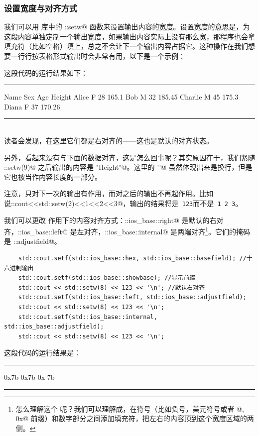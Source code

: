 \subsubsection*{设置宽度与对齐方式}
我们可以用 \lstinline@iomanip@ 库中的 \lstinline@std::setw@ 函数来设置输出内容的宽度。设置宽度的意思是，为这段内容单独定制一个输出宽度，如果输出内容实际上没有那么宽，那程序也会拿填充符（比如空格）填上，总之不会让下一个输出内容占据它。这种操作在我们想要一行行按表格形式输出时会非常有用，以下是一个示例：

这段代码的运行结果如下：\\\noindent\rule{\linewidth}{.2pt}
\begin{verbatim*}
     Name  Sex  Age  Height
    Alice    F   28    165.1
      Bob    M   32   185.45
  Charlie    M   45    175.3
    Diana    F   37   170.26
\end{verbatim*}\noindent\rule{\linewidth}{.2pt}\\
读者会发现，在这里它们都是右对齐的——这也是默认的对齐状态。\par
另外，\lstinline@Height@ 看起来没有与下面的数据对齐，这是怎么回事呢？其实原因在于，我们紧随 \lstinline@std::setw(9)@ 之后输出的内容是 \lstinline@"Height\n"@。这里的 \lstinline@'\n'@ 虽然体现出来是换行，但是它也被当作内容长度的一部分。\par
注意，\lstinline@setw@ 只对下一次的输出有作用，而对之后的输出不再起作用。比如说\lstinline@std::cout<<std::setw(2)<<1<<2<<3@，输出的结果将是\texttt{ 123}而不是\texttt{ 1 2 3}。\par
我们可以更改 \lstinline@setw@ 作用下的内容对齐方式：\lstinline@std::ios_base::right@ 是默认的右对齐，\lstinline@std::ios_base::left@ 是左对齐，\lstinline@std::ios_base::internal@ 是两端对齐\footnote{怎么理解这个 \lstinline@internal@ 呢？我们可以理解成，在符号（比如负号，美元符号或者 @, \lstinline@0x@ 前缀）和数字部分之间添加填充符，把左右的内容顶到这个宽度区域的两侧。}。它们的掩码是 \lstinline@std::adjustfield@。
\begin{lstlisting}
    std::cout.setf(std::ios_base::hex, std::ios_base::basefield); //十六进制输出
    std::cout.setf(std::ios_base::showbase); //显示前缀
    std::cout << std::setw(8) << 123 << '\n'; //默认右对齐
    std::cout.setf(std::ios_base::left, std::ios_base::adjustfield);
    std::cout << std::setw(8) << 123 << '\n';
    std::cout.setf(std::ios_base::internal, std::ios_base::adjustfield);
    std::cout << std::setw(8) << 123 << '\n';
\end{lstlisting}
这段代码的运行结果是：\\\noindent\rule{\linewidth}{.2pt}
\begin{verbatim*}
    0x7b
0x7b    
0x    7b
\end{verbatim*}\noindent\rule{\linewidth}{.2pt}
